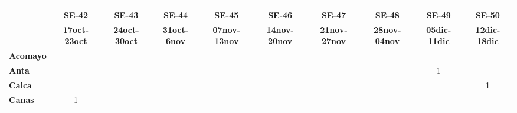 \begin{tabular}{lccccccccc}
	\textbf{}              & \multicolumn{1}{l}{}                        & \multicolumn{1}{l}{}      & \multicolumn{1}{l}{}                         & \multicolumn{1}{l}{}                         & \multicolumn{1}{l}{}                         & \multicolumn{1}{l}{}                        & \multicolumn{1}{l}{}                         & \multicolumn{1}{l}{}                         & \multicolumn{1}{l}{}     \\
	\textbf{}                                                                                 
    &\textbf{SE-42}                   &\textbf{SE-43}                  
	&\textbf{SE-44} 
	&\textbf{SE-45} 							&\textbf{SE-46} 
	&\textbf{SE-47}								&\textbf{SE-48}  				  &\textbf{SE-49}
	&\textbf{SE-50}\\
		\textbf{}              
	&\textbf{17oct-23oct} 						&\textbf{24oct-30oct} 		       &\textbf{31oct-6nov}  						&\textbf{07nov-13nov} 
	&\textbf{14nov-20nov} 						&\textbf{21nov-27nov} 	  		&\textbf{28nov-04nov} 	
	&\textbf{05dic-11dic}						&\textbf{12dic-18dic}\\
	\textbf{Acomayo}                        	
	&\cellcolor[HTML]{FCC46C}                   &\cellcolor[HTML]{FCC46C}          			&\cellcolor[HTML]{FCC46C}                  
	&\cellcolor[HTML]{FCC46C}  			        &\cellcolor[HTML]{FCC46C}          &\cellcolor[HTML]{FCC46C} 					&\cellcolor[HTML]{FCC46C} 	    &\cellcolor[HTML]{FCC46C}
	&\cellcolor[HTML]{FCC46C}\\
	\textbf{Anta}                                                          		
	&\cellcolor[HTML]{FCC46C}         &\cellcolor[HTML]{FCC46C} 			    
	&\cellcolor[HTML]{FCC46C} 				    &\cellcolor[HTML]{FCC46C}		  &\cellcolor[HTML]{FCC46C}					&\cellcolor[HTML]{FCC46C}					
	&\cellcolor[HTML]{FCC46C} 					&1
	&\cellcolor[HTML]{FCC46C}\\
	\textbf{Calca}      				       
	&\cellcolor[HTML]{FCC46C}         			&\cellcolor[HTML]{FCC46C}       
	&\cellcolor[HTML]{FCC46C}                   &\cellcolor[HTML]{FCC46C}         &\cellcolor[HTML]{FCC46C}                
	&\cellcolor[HTML]{FCC46C}                   &\cellcolor[HTML]{FCC46C}  		  &\cellcolor[HTML]{FCC46C} 					&1 				   \\                										
	\textbf{Canas}                              
	&1        			              			&\cellcolor[HTML]{FCC46C}                   &\cellcolor[HTML]{FCC46C} 					&\cellcolor[HTML]{FCC46C}       			&\cellcolor[HTML]{FCC46C} 
	&\cellcolor[HTML]{FCC46C} 					&\cellcolor[HTML]{FCC46C} 		&\cellcolor[HTML]{FCC46C}					&\cellcolor[HTML]{FCC46C}\\

\end{tabular}
